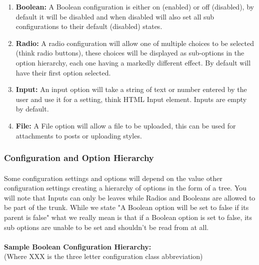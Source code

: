 \documentclass[]{article}
\begin{document}
\begin{enumerate}
    \item \textbf{Boolean:} A Boolean configuration is either on (enabled) or off (disabled), by default it will be disabled and when disabled will also set all sub configurations to their default (disabled) states.
    \item \textbf{Radio:} A radio configuration will allow one of multiple choices to be selected (think radio buttons), these choices will be displayed as sub-options in the option hierarchy, each one having a markedly different effect. By default will have their first option selected.
    \item \textbf{Input:} An input option will take a string of text or number entered by the user and use it for a setting, think HTML Input element. Inputs are empty by default.
    \item \textbf{File:} A File option will allow a file to be uploaded, this can be used for attachments to posts or uploading styles. 
\end{enumerate}

\subsubsection{Configuration and Option Hierarchy}\label{confighier}
\paragraph{}
Some configuration settings and options will depend on the value other configuration settings creating a hierarchy of options in the form of a tree. You will note that Inputs can only be leaves while Radios and Booleans are allowed to be part of the trunk. While we state "A Boolean option will be set to false if its parent is false" what we really mean is that if a Boolean option is set to false, its sub options are unable to be set and shouldn't be read from at all.
\\\\
\textbf{Sample Boolean Configuration Hierarchy:}\\
(Where XXX is the three letter configuration class abbreviation)
\end{document}
